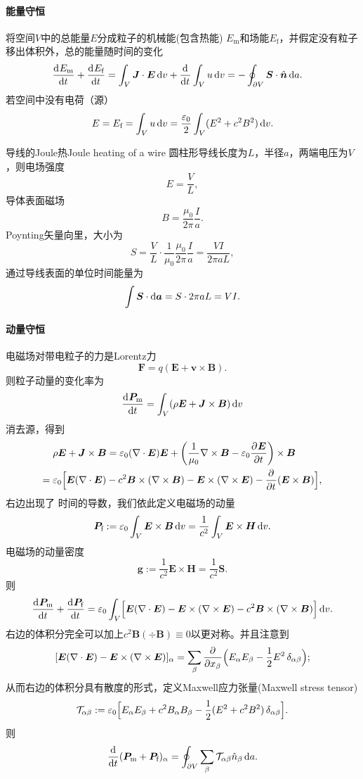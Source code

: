 \paragraph{能量守恒}
将空间$V$中的总能量$E$分成粒子的机械能(包含热能) $E_\text{m}$和场能$E_\text{f}$，并假定没有粒子移出体积外，总的能量随时间的变化
\begin{align*}
    \frac{\mathrm{d}^{{}}E_\text m}{\mathrm{d}{t}^{{}}}+\frac{\mathrm{d}^{{}}E_\text f}{\mathrm{d}{t}^{{}}}&=\int_V\bm J\cdot\bm E\mathop{}\!\mathrm{d} v+\frac{\mathrm{d}^{{}}}{\mathrm{d}{t}^{{}}}\int_Vu\mathop{}\!\mathrm{d} v=-\oint_{\partial V}\bm S\cdot\mathop{}\!\hat{\bm{n}}\mathop{}\!\mathrm{d} a.
\end{align*}
若空间中没有电荷（源）
\[
    E=E_\text f=\int_Vu\mathop{}\!\mathrm{d} v=\frac{\varepsilon_0}2\int_V(E^2+c^2B^2)\mathop{}\!\mathrm{d} v.
\]
\begin{example}{导线的Joule热}{Joule heating of a wire}
    圆柱形导线长度为$L$，半径$a$，两端电压为$V$，则电场强度
    \[
        E=\frac VL,
    \]
    导体表面磁场
    \[
        B=\frac{\mu_0}{2\pi}\frac Ia.
    \]
    Poynting矢量向里，大小为
    \[
        S=\frac VL\cdot\frac1{\mu_0}\frac{\mu_0}{2\pi}\frac Ia=\frac{VI}{2\pi aL},
    \]
    通过导线表面的单位时间能量为
    \[
        \int \bm S\cdot\mathop{}\!\mathrm{d}\bm a=S\cdot 2\pi aL=VI.
    \]
\end{example}
\paragraph{动量守恒}
电磁场对带电粒子的力是Lorentz力
\[
    \bm F=q(\bm E+\bm v\times\bm B).
\]
则粒子动量的变化率为
\[
    \frac{\mathrm{d}^{{}}\bm P_\text m}{\mathrm{d}{t}^{{}}}=\int_V(\rho\bm E+\bm J\times\bm B)\mathop{}\!\mathrm{d} v
\]
消去源，得到
\begin{align*}
    &\rho\bm E+\bm J\times\bm B=\varepsilon_0(\nabla\cdot\bm E)\bm E+\biggl(\frac1{\mu_0}\nabla\times\bm B-\varepsilon_0\frac{\partial^{{}}\bm E}{\partial{t}^{{}}}\biggr)\times\bm B\\
    ={}&\varepsilon_0\Bigl[\bm E(\nabla\cdot\bm E)-c^2\bm B\times(\nabla\times\bm B)-\bm E\times(\nabla\times\bm E)-\frac{\partial^{{}}}{\partial{t}^{{}}}(\bm E\times\bm B)\Bigr],
\end{align*}
右边出现了%
时间的导数，我们依此定义电磁场的动量
\[
    \bm P_\text f:=\varepsilon_0\int_V\bm E\times\bm B\mathop{}\!\mathrm{d} v=\frac1{c^2}\int_V\bm E\times\bm H\mathop{}\!\mathrm{d} v.
\]
电磁场的动量密度
\[
    \bm g:=\frac1{c^2}\bm E\times\bm H=\frac1{c^2}\bm S.
\]
则
\[
    \frac{\mathrm{d}^{{}}\bm P_\text m}{\mathrm{d}{t}^{{}}}+\frac{\mathrm{d}^{{}}\bm P_\text f}{\mathrm{d}{t}^{{}}}=\varepsilon_0\int_V\Bigl[\bm E(\nabla\cdot\bm E)-\bm E\times(\nabla\times\bm E)-c^2\bm B\times(\nabla\times\bm B)\Bigr]\mathop{}\!\mathrm{d} v.
\]
右边的体积分完全可以加上$c^2\bm B(\div\bm B)\equiv 0$以更对称。并且注意到
\[
    [\bm E(\nabla\cdot\bm E)-\bm E\times(\nabla\times\bm E)]_\alpha=\sum_\beta\frac{\partial^{{}}}{\partial{x_\beta}^{{}}}\Bigl(E_\alpha E_\beta-\frac12E^2\mathop{}\!\delta_{\alpha\beta}\Bigr);
\]
从而右边的体积分具有散度的形式，定义Maxwell应力张量(Maxwell stress tensor)
\[
    \mathcal T_{\alpha\beta}:=\varepsilon_0\Bigl[E_\alpha E_\beta+c^2B_\alpha B_\beta-\frac12(E^2+c^2B^2)\mathop{}\!\delta_{\alpha\beta}\Bigr].
\]
则
\[
    \frac{\mathrm{d}^{{}}}{\mathrm{d}{t}^{{}}}({\bm P_\text m}+{\bm P_\text f})_\alpha=\oint_{\partial V}\sum_\beta\mathcal  T_{\alpha\beta}\hat n_\beta\mathop{}\!\mathrm{d} a.
\]
